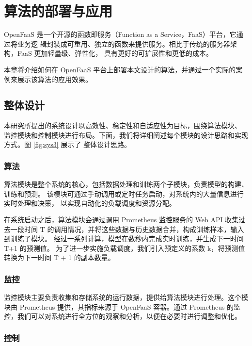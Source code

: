 \documentclass[a4paper,AutoFakeBold,oneside,12pt]{book}
\begin{document}
\chapter{算法的部署与应用}

OpenFaaS 是一个开源的函数即服务（Function as a Service，FaaS）平台，它通过将业务逻
辑封装成可重用、独立的函数来提供服务。相比于传统的服务器架构，FaaS 更加轻量级、弹性化，
具有更好的可扩展性和更低的成本。

本章将介绍如何在 OpenFaaS 平台上部署本文设计的算法，并通过一个实际的案例来展示该算法的应用效果。


\section{整体设计}

本研究所提出的系统设计以高效性、稳定性和自适应性为目标，围绕算法模块、
监控模块和控制模块进行布局。下面，我们将详细阐述每个模块的设计思路和实现方式。图 \ref{fig:sys3} 展示了
整体设计思路。






\subsection{算法}

算法模块是整个系统的核心，包括数据处理和训练两个子模块，负责模型的构建、训练和预测。
该模块可通过手动调用或定时任务启动，对系统内的大量信息进行实时处理和决策，
以实现自动化的负载调度和资源分配。

在系统启动之后，算法模块会通过调用 Prometheus 监控服务的 Web API 收集过去一段时间
 T 的调用情况，并将这些数据与历史数据合并，构成训练样本，输入到训练子模块。
 经过一系列计算，模型在数秒内完成实时训练，并生成下一时间 T+1 的预测值。
 为了进一步实施负载调度，我们引入预定义的系数 k，将预测值转换为下一时间 T + 1 的副本数量。

\subsection{监控}

监控模块主要负责收集和存储系统的运行数据，提供给算法模块进行处理。这个模块由 Prometheus 提供，其指标来源于 OpenFaaS 容器。通过 Prometheus 的监控，我们可以对系统进行全方位的观察和分析，以便在必要时进行调整和优化。

\subsection{控制}
\end{document}
